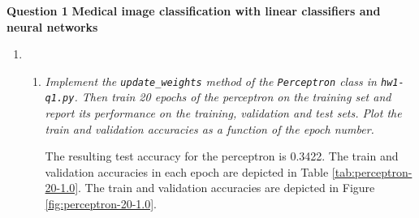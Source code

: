 \documentclass[12pt]{article}
\begin{document}
\center\large{\vskip 0.5cm\textbf{Question 1}}
\center\textbf{Medical image classification with linear classifiers and neural networks}
\begin{enumerate}[leftmargin=\labelsep]

    \item
          \begin{enumerate}[label=\alph*)]

              \item \textit{Implement the \texttt{update\_weights} method of the \texttt{Perceptron} class in \texttt{hw1-q1.py}. Then train 20 epochs of the perceptron on the training set and report its performance on the training, validation and test sets. Plot the train and validation accuracies as a function of the epoch number.}

                    \vspace{12pt}

                    The resulting test accuracy for the perceptron is 0.3422. The train and validation accuracies in each epoch are depicted in Table \ref{tab:perceptron-20-1.0}. The train and validation accuracies are depicted in Figure \ref{fig:perceptron-20-1.0}.


\end{enumerate}
\end{enumerate}
\end{document}
